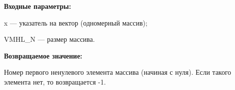 \textbf{Входные параметры:}

 x --- указатель на вектор (одномерный массив);
 
 VMHL\_N --- размер массива.

\textbf{Возвращаемое значение:}

Номер первого ненулевого элемента массива (начиная с нуля). Если такого элемента нет, то возвращается -1.